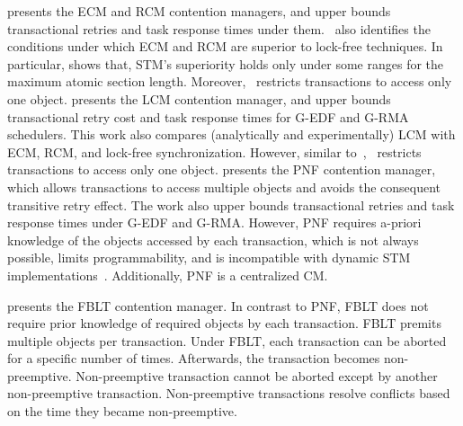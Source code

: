 \documentclass[conference]{IEEEtran}
\begin{document}
\cite{stmconcurrencycontrol:emsoft11} presents the ECM and RCM contention managers, and upper bounds transactional retries and task response times under them.~\cite{stmconcurrencycontrol:emsoft11} also identifies the conditions under which ECM and RCM are superior to lock-free techniques. In particular, \cite{stmconcurrencycontrol:emsoft11} shows that, STM's superiority holds only under some ranges for the maximum atomic section length.  Moreover,~\cite{stmconcurrencycontrol:emsoft11} restricts transactions to access only one object. \cite{lcmdac2012} presents the LCM contention manager, and upper bounds transactional retry cost and task response times for G-EDF and G-RMA schedulers. This work also compares (analytically and experimentally) LCM with ECM, RCM, and lock-free synchronization. However, similar to~\cite{stmconcurrencycontrol:emsoft11},~\cite{lcmdac2012} restricts transactions to access only one object. \cite{pnf_dac_asp} presents the PNF contention manager, which allows transactions to access  multiple objects and avoids the consequent transitive retry effect. The work also upper bounds transactional retries and task response times under G-EDF and G-RMA. However, PNF requires a-priori knowledge of the objects accessed by each transaction, which is not always possible, limits programmability, and is incompatible with dynamic STM implementations~\cite{Herlihy:2003:STM:872035.872048}. Additionally, PNF is a centralized CM.

\cite{fblt} presents the FBLT contention manager. In contrast to PNF, FBLT does not require prior knowledge of required objects by each transaction. FBLT premits multiple objects per transaction.
Under FBLT, each transaction can be aborted for a specific number of times. Afterwards, the transaction becomes non-preemptive. Non-preemptive transaction cannot be aborted except by another non-preemptive transaction. Non-preemptive transactions resolve conflicts based on the time they became non-preemptive. 
\end{document}
